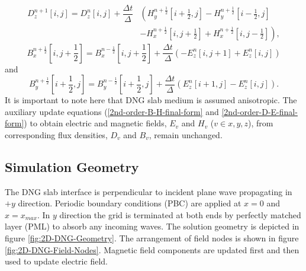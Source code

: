 \begin{equation}
\begin{split}
D^{n+1}_z \left[i,j\right]=D^{n}_z \left[i,j\right]+\dfrac{\Delta t}{\Delta}&\left(H^{n+\frac{1}{2}}_y\left[i+\frac{1}{2},j\right]-H^{n+\frac{1}{2}}_y \left[i-\frac{1}{2},j\right]\right.\\
&\left.-H^{n+\frac{1}{2}}_x \left[i,j+\frac{1}{2}\right]+H^{n+\frac{1}{2}}_x \left[i,j-\frac{1}{2}\right]\right),
\end{split}
\label{eq:Dz-2D-FDTD-TMz}
\end{equation}
\begin{equation}
B^{n+\frac{1}{2}}_x \left[i,j+\frac{1}{2}\right]=B^{n-\frac{1}{2}}_x \left[i,j+\frac{1}{2}\right] + \dfrac{\Delta t}{\Delta} \left(-E^{n}_z \left[i,j+1\right] + E^{n}_z \left[i,j\right] \right)
\label{eq:Bx-2D-FDTD-TMz}
\end{equation}
and
\begin{equation}
B^{n+\frac{1}{2}}_y \left[i+\frac{1}{2},j\right]=B^{n-\frac{1}{2}}_y \left[i+\frac{1}{2},j\right] + \dfrac{\Delta t}{\Delta} \left( E^{n}_z \left[i+1,j\right] - E^{n}_z \left[i,j\right] \right).
\label{eq:By-2D-FDTD-TMz}
\end{equation}
It is important to note here that DNG slab medium is assumed anisotropic. The auxiliary update equations (\ref{2nd-order-B-H-final-form} and \ref{2nd-order-D-E-final-form}) to obtain electric and magnetic fields, $E_v$ and $H_v$ ($v\in x,y,z$), from corresponding flux densities, $D_v$ and $B_v$, remain unchanged.
\subsection{Simulation Geometry}
The DNG slab interface is perpendicular to incident plane wave propagating in $+y$ direction. Periodic boundary conditions (PBC) are applied at $x=0$ and $x=x_{max}$. In $y$ direction the grid is terminated at both ends by perfectly matched layer (PML) to absorb any incoming waves. The solution geometry is depicted in figure \ref{fig:2D-DNG-Geometry}. The arrangement of field nodes is shown in figure \ref{fig:2D-DNG-Field-Nodes}.  Magnetic field components are updated first and then used to update electric field.

